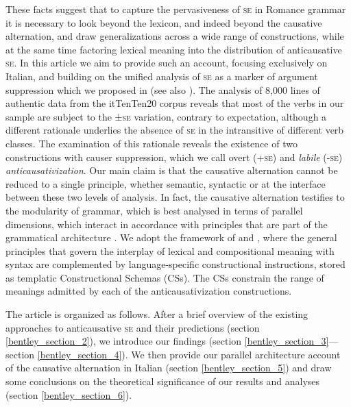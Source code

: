\documentclass[output=paper,colorlinks,citecolor=brown
]{langscibook}
\begin{document}
These facts suggest that to capture the pervasiveness of \textsc{se} in Romance grammar it is necessary to look beyond the lexicon, and indeed beyond the causative alternation, and draw generalizations across a wide range of constructions, while at the same time factoring lexical meaning into the distribution of anticausative \textsc{se}. In this article we aim to provide such an account, focusing exclusively on Italian, and building on the unified analysis of \textsc{se} as a marker of argument suppression which we proposed in \citet{bentley2006split} (see also \cite{vanvalin1990semantic,centineo1995distribution}). The analysis of 8,000 lines of authentic data from the itTenTen20 corpus \citep{jakubicek2013tenten} reveals that most of the verbs in our sample are subject to the ±\textsc{se} variation, contrary to expectation, although a different rationale underlies the absence of \textsc{se} in the intransitive of different verb classes.  The examination of this rationale reveals the existence of two constructions with causer suppression, which we call \textit{}{overt} (+\textsc{se}) and \textit{labile} (-\textsc{se}) \textit{anticausativization}. Our main claim is that the causative alternation cannot be reduced to a single principle, whether semantic, syntactic or at the interface between these two levels of analysis. In fact, the causative alternation testifies to the modularity of grammar, which is best analysed in terms of parallel dimensions, which interact in accordance with principles that are part of the grammatical architecture \citep{bresnan1989locative,vanvalin1997syntax,jackendoff2002foundations,vanvalin2005exploring,vanvalin2023principles}. We adopt the framework of \citet{vanvalin1997syntax} and \citet{vanvalin2005exploring,vanvalin2023principles}, where the general principles that govern the interplay of lexical and compositional meaning with syntax are complemented by language-specific constructional instructions, stored as templatic Constructional Schemas (CSs). The CSs constrain the range of meanings admitted by each of the anticausativization constructions. 

The article is organized as follows. After a brief overview of the existing approaches to anticausative \textsc{se} and their predictions (section \ref{bentley_section_2}), we introduce our findings (section \ref{bentley_section_3}—section \ref{bentley_section_4}). We then provide our parallel architecture account of the causative alternation in Italian (section \ref{bentley_section_5}) and draw some conclusions on the theoretical significance of our results and analyses (section \ref{bentley_section_6}). 
\end{document}
